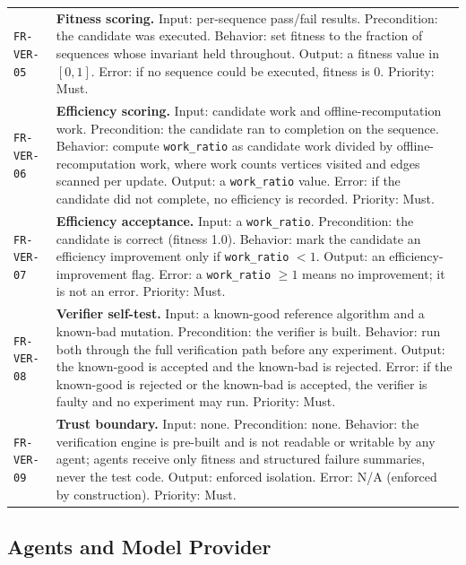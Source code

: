 \documentclass[12pt,a4paper]{article}
\begin{document}
\begin{longtable}{@{}p{2.2cm}p{10.6cm}@{}}
\texttt{FR-VER-05} & \textbf{Fitness scoring.} Input: per-sequence pass/fail results. Precondition: the candidate was executed. Behavior: set fitness to the fraction of sequences whose invariant held throughout. Output: a fitness value in $[0,1]$. Error: if no sequence could be executed, fitness is 0. Priority: Must. \\
\addlinespace[2pt]

\texttt{FR-VER-06} & \textbf{Efficiency scoring.} Input: candidate work and offline-recomputation work. Precondition: the candidate ran to completion on the sequence. Behavior: compute \texttt{work\_ratio} as candidate work divided by offline-recomputation work, where work counts vertices visited and edges scanned per update. Output: a \texttt{work\_ratio} value. Error: if the candidate did not complete, no efficiency is recorded. Priority: Must. \\
\addlinespace[2pt]

\texttt{FR-VER-07} & \textbf{Efficiency acceptance.} Input: a \texttt{work\_ratio}. Precondition: the candidate is correct (fitness 1.0). Behavior: mark the candidate an efficiency improvement only if \texttt{work\_ratio} $< 1$. Output: an efficiency-improvement flag. Error: a \texttt{work\_ratio} $\ge 1$ means no improvement; it is not an error. Priority: Must. \\
\addlinespace[2pt]

\texttt{FR-VER-08} & \textbf{Verifier self-test.} Input: a known-good reference algorithm and a known-bad mutation. Precondition: the verifier is built. Behavior: run both through the full verification path before any experiment. Output: the known-good is accepted and the known-bad is rejected. Error: if the known-good is rejected or the known-bad is accepted, the verifier is faulty and no experiment may run. Priority: Must. \\
\addlinespace[2pt]

\texttt{FR-VER-09} & \textbf{Trust boundary.} Input: none. Precondition: none. Behavior: the verification engine is pre-built and is not readable or writable by any agent; agents receive only fitness and structured failure summaries, never the test code. Output: enforced isolation. Error: N/A (enforced by construction). Priority: Must. \\
\bottomrule
\end{longtable}

\subsection{Agents and Model Provider}
\end{document}
